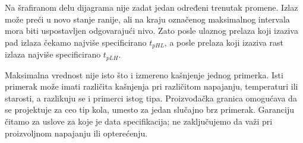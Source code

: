 
Na šrafiranom delu dijagrama nije zadat jedan određeni trenutak promene. Izlaz može preći u novo stanje ranije, ali na kraju označenog maksimalnog intervala mora biti uspostavljen odgovarajući nivo. Zato posle ulaznog prelaza koji izaziva pad izlaza čekamo najviše specificirano \(t_{pHL}\), a posle prelaza koji izaziva rast izlaza najviše specificirano \(t_{pLH}\).

Maksimalna vrednost nije isto što i izmereno kašnjenje jednog primerka. Isti primerak može imati različita kašnjenja pri različitom napajanju, temperaturi ili starosti, a razlikuju se i primerci istog tipa. Proizvođačka granica omogućava da se projektuje za ceo tip kola, umesto za jedan slučajno brz primerak. Garanciju čitamo za uslove za koje je data specifikacija; ne zaključujemo da važi pri proizvoljnom napajanju ili opterećenju.
